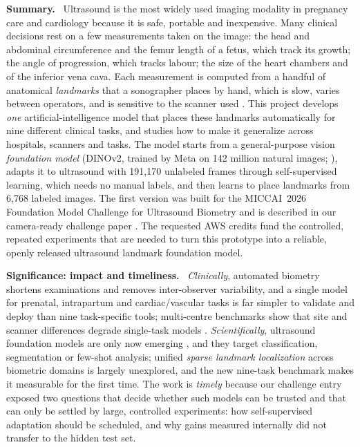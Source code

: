 \documentclass[11pt,a4paper]{article}
\newcommand{\para}[1]{\textbf{#1}\ }
\begin{document}
\para{Summary.} Ultrasound is the most widely used imaging modality in pregnancy care and cardiology because it is safe, portable and inexpensive. Many clinical decisions rest on a few measurements taken on the image: the head and abdominal circumference and the femur length of a fetus, which track its growth; the angle of progression, which tracks labour; the size of the heart chambers and of the inferior vena cava. Each measurement is computed from a handful of anatomical \emph{landmarks} that a sonographer places by hand, which is slow, varies between operators, and is sensitive to the scanner used \citep{salomon2019isuog,ghi2018isuog,mitchell2019comprehensive}. This project develops \emph{one} artificial-intelligence model that places these landmarks automatically for nine different clinical tasks, and studies how to make it generalize across hospitals, scanners and tasks. The model starts from a general-purpose vision \emph{foundation model} (DINOv2, trained by Meta on 142 million natural images; \citealp{oquab2023dinov2}), adapts it to ultrasound with 191,170 unlabeled frames through self-supervised learning, which needs no manual labels, and then learns to place landmarks from 6,768 labeled images. The first version was built for the MICCAI~2026 Foundation Model Challenge for Ultrasound Biometry \citep{gu_biometry} and is described in our camera-ready challenge paper \citep{panagiotakopoulou2026fub}. The requested AWS credits fund the controlled, repeated experiments that are needed to turn this prototype into a reliable, openly released ultrasound landmark foundation model.

\para{Significance: impact and timeliness.} \emph{Clinically}, automated biometry shortens examinations and removes inter-observer variability, and a single model for prenatal, intrapartum and cardiac/vascular tasks is far simpler to validate and deploy than nine task-specific tools; multi-centre benchmarks show that site and scanner differences degrade single-task models \citep{divece2026multicentre,bai2026beyond}. \emph{Scientifically}, ultrasound foundation models are only now emerging \citep{jiao2024usfm,ambsdorf2025general,lin2025uusic}, and they target classification, segmentation or few-shot analysis; unified \emph{sparse landmark localization} across biometric domains is largely unexplored, and the new nine-task benchmark \citep{gu_biometry,deng2026baseline} makes it measurable for the first time. The work is \emph{timely} because our challenge entry exposed two questions that decide whether such models can be trusted and that can only be settled by large, controlled experiments: how self-supervised adaptation should be scheduled, and why gains measured internally did not transfer to the hidden test set.
\end{document}
